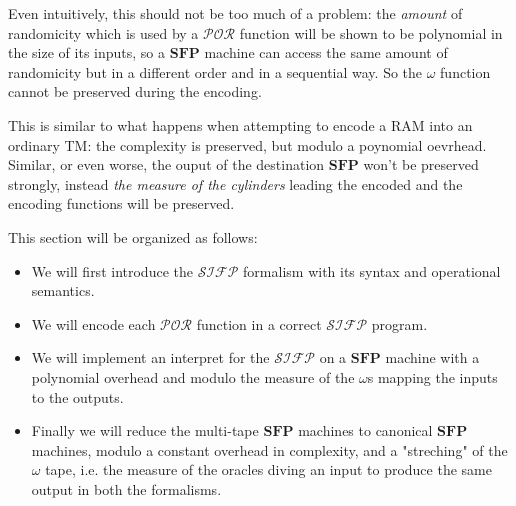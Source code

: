 \documentclass[10pt]{amsart}
\newcommand{\SFP}{\mathbf{SFP}}
\newcommand{\POR}{\mathcal{POR}}
\newcommand{\SIFP}{\mathcal{SIFP}}
\begin{document}
Even intuitively, this should not be too much of a problem: the \emph{amount} of randomicity which is used by a $\POR$ function will be shown to be polynomial in the size of its inputs, so a $\SFP$ machine can access the same amount of randomicity but in a different order and in a sequential way. So the $\omega$ function cannot be preserved during the encoding.

This is similar to what happens when attempting to encode a RAM into an ordinary TM: the complexity is preserved, but modulo a poynomial oevrhead. Similar, or even worse, the ouput of the destination $\SFP$ won't be preserved strongly, instead \emph{the measure of the cylinders} leading the encoded and the encoding functions will be preserved.      


This section will be organized as follows:

\begin{itemize}
\item We will first introduce the $\SIFP$ formalism with its syntax and operational semantics.
\item We will encode each $\POR$ function in a correct $\SIFP$ program.
\item We will implement an interpret for the $\SIFP$ on a $\SFP$ machine with a polynomial overhead and modulo the measure of the $\omega$s mapping the inputs to the outputs.
\item Finally we will reduce the multi-tape $\SFP$ machines to canonical $\SFP$ machines, modulo a constant overhead in complexity, and a "streching" of the $\omega$ tape, i.e. the measure of the oracles diving an input to produce the same output in both the formalisms.  
\end{itemize}
\end{document}
